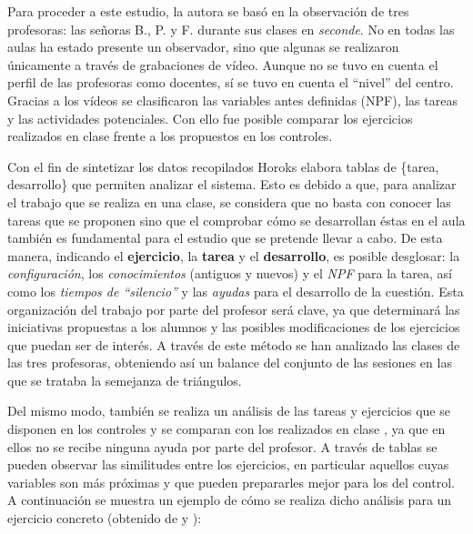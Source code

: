 	Para proceder a este estudio, la autora se basó en la observación de tres profesoras: las señoras B., P. y F. durante sus clases en \textit{seconde}. No en todas las aulas ha estado presente un observador, sino que algunas se realizaron únicamente a través de grabaciones de vídeo. Aunque no se tuvo en cuenta el perfil de las profesoras como docentes, sí se tuvo en cuenta el ``nivel'' del centro.  Gracias a los vídeos se clasificaron las variables antes definidas (NPF), las tareas y las actividades potenciales. Con ello fue posible comparar los ejercicios realizados en clase frente a los propuestos en los controles.
	
	Con el fin de sintetizar los datos recopilados Horoks elabora tablas de \{tarea, desarrollo\} que permiten analizar el sistema. Esto es debido a que, para analizar el trabajo que se realiza en una clase, se considera que no basta con conocer las tareas que se proponen sino que el comprobar cómo se desarrollan éstas en el aula también es fundamental para el estudio que se pretende llevar a cabo. De esta manera, indicando el \textbf{ejercicio}, la \textbf{tarea} y el \textbf{desarrollo}, es posible desglosar: la \textit{configuración}, los \textit{conocimientos} (antiguos y nuevos) y el \textit{NPF} para la tarea, así como los \textit{tiempos de ``silencio''} y las \textit{ayudas} para el desarrollo de la cuestión. Esta organización del trabajo por parte del profesor será clave, ya que determinará las iniciativas propuestas a los alumnos y las posibles modificaciones de los ejercicios que puedan ser de interés. A través de este método se han analizado las clases de las tres profesoras, obteniendo así un balance del conjunto de las sesiones en las que se trataba la semejanza de triángulos.
	
	Del mismo modo, también se realiza un análisis de las tareas y ejercicios que se disponen en los controles y se comparan con los realizados en clase%
	, ya que en ellos no se recibe ninguna ayuda por parte del profesor. A través de tablas %
	 se pueden observar las similitudes entre los ejercicios, en particular aquellos cuyas variables son más próximas y que pueden prepararles mejor para los del control. A continuación se muestra un ejemplo de cómo se realiza dicho análisis para un ejercicio concreto (obtenido de \citet[p. 398-401]{Horoks} y \citet[p. 110]{TH}):%
	 
